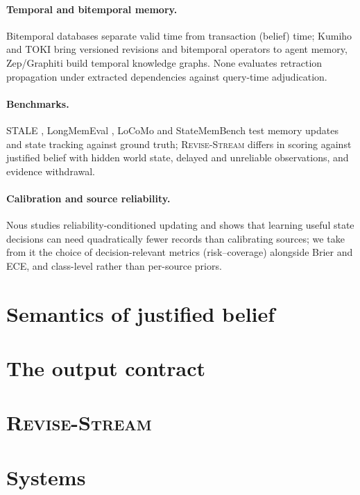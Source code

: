 \documentclass[11pt]{article}
\newcommand{\rs}{\textsc{Revise-Stream}}
\begin{document}
\paragraph{Temporal and bitemporal memory.} Bitemporal databases \citep{snodgrass} separate valid time from transaction (belief) time; Kumiho \citep{kumiho2026} and TOKI \citep{toki2026} bring versioned revisions and bitemporal operators to agent memory, Zep/Graphiti \citep{graphiti2025} build temporal knowledge graphs. None evaluates retraction propagation under extracted dependencies against query-time adjudication.
\paragraph{Benchmarks.} STALE \citep{stale2026}, LongMemEval \citep{longmemeval}, LoCoMo and StateMemBench test memory updates and state tracking against ground truth; \rs{} differs in scoring against justified belief with hidden world state, delayed and unreliable observations, and evidence withdrawal.
\paragraph{Calibration and source reliability.} Nous \citep{nous2026a,nous2026b} studies reliability-conditioned updating and shows that learning useful state decisions can need quadratically fewer records than calibrating sources; we take from it the choice of decision-relevant metrics (risk--coverage) alongside Brier and ECE, and class-level rather than per-source priors.

\section{Semantics of justified belief}\label{sec:semantics}


\section{The output contract}\label{sec:contract}


\section{\rs}\label{sec:benchmark}


\section{Systems}\label{sec:systems}

\end{document}
